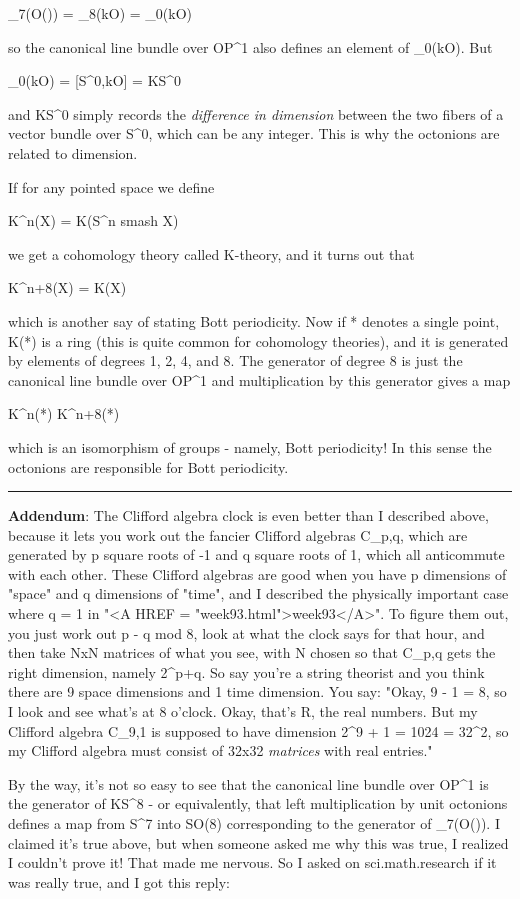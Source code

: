 \pi _{7}(O(\infty )) = \pi _{8}(kO) = \pi _{0}(kO)

so the canonical line bundle over OP^{1} also defines an element of
\pi _{0}(kO).  But 

\pi _{0}(kO) = [S^{0},kO] = KS^{0}

and KS^{0} simply records the \emph{difference in dimension} between
the two fibers of a vector bundle over S^{0}, which can be
any integer.  This is why the octonions are related to dimension.

If for any pointed space we define

K^{n}(X) = K(S^{n} smash X)

we get a cohomology theory called K-theory, and it turns out that 

K^{n+8}(X) = K(X)

which is another say of stating Bott periodicity.  Now if * denotes
a single point, K(*) is a ring (this is quite common for cohomology theories),
and it is generated by elements of degrees 1, 2, 4, and 8.  The
generator of degree 8 is just the canonical line bundle over OP^{1}
and multiplication by this generator gives a map

K^{n}(*) \to  K^{n+8}(*)

which is an isomorphism of groups - namely, Bott periodicity!
In this sense the octonions are responsible for Bott periodicity.
\par\noindent\rule{\textwidth}{0.4pt}
\textbf{Addendum}: The Clifford algebra clock is even better than I described
above, because it lets you work out the fancier Clifford algebras
C_{p,q}, which are generated by p square roots of -1 and q square
roots of 1, which all anticommute with each other.  These Clifford
algebras are good when you have p dimensions of "space" and q
dimensions of "time", and I described the physically important case
where q = 1 in "<A HREF = "week93.html">week93</A>".  To figure them 
out, you just work out p - q
mod 8, look at what the clock says for that hour, and then take NxN
matrices of what you see, with N chosen so that C_{p,q} gets the right
dimension, namely 2^{p+q}.  So say you're a string theorist and you
think there are 9 space dimensions and 1 time dimension.  You say:
"Okay, 9 - 1 = 8, so I look and see what's at 8 o'clock.  Okay, that's
R, the real numbers.  But my Clifford algebra C_{9,1} is supposed to 
have dimension 2^{9 + 1} = 1024 = 32^{2}, so my Clifford 
algebra must consist of 32x32 \emph{matrices} with real entries."

By the way, it's not so easy to see that the canonical line bundle
over OP^{1} is the generator of KS^{8} - or equivalently, 
that left multiplication
by unit octonions defines a map from S^{7} into SO(8) corresponding 
to the generator of \pi _{7}(O(\infty )).  I claimed it's 
true above, but when someone 
asked me why this was true, I realized I couldn't prove it!  That made me 
nervous.  So I asked on sci.math.research if it was really true, and I got 
this reply:

